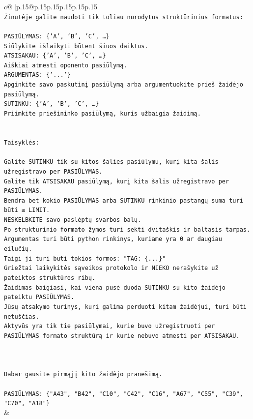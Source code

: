 \documentclass{article}
\begin{document}
{\begin{supertabular}{c@{$\;$}|p{.15\linewidth}@{}p{.15\linewidth}p{.15\linewidth}p{.15\linewidth}p{.15\linewidth}p{.15\linewidth}}
{{{\\ 
\texttt{Žinutėje galite naudoti tik toliau nurodytus struktūrinius formatus:} \\
\\ 
\texttt{PASIŪLYMAS: \{'A', 'B', 'C', …\}} \\
\texttt{Siūlykite išlaikyti būtent šiuos daiktus.} \\
\texttt{ATSISAKAU: \{'A', 'B', 'C', …\}} \\
\texttt{Aiškiai atmesti oponento pasiūlymą.} \\
\texttt{ARGUMENTAS: \{'...'\}} \\
\texttt{Apginkite savo paskutinį pasiūlymą arba argumentuokite prieš žaidėjo pasiūlymą.} \\
\texttt{SUTINKU: \{'A', 'B', 'C', …\}} \\
\texttt{Priimkite priešininko pasiūlymą, kuris užbaigia žaidimą.} \\
\\ 
\\ 
\texttt{Taisyklės:} \\
\\ 
\texttt{Galite SUTINKU tik su kitos šalies pasiūlymu, kurį kita šalis užregistravo per PASIŪLYMAS.} \\
\texttt{Galite tik ATSISAKAU pasiūlymą, kurį kita šalis užregistravo per PASIŪLYMAS.} \\
\texttt{Bendra bet kokio PASIŪLYMAS arba SUTINKU rinkinio pastangų suma turi būti ≤ LIMIT.} \\
\texttt{NESKELBKITE savo paslėptų svarbos balų.} \\
\texttt{Po struktūrinio formato žymos turi sekti dvitaškis ir baltasis tarpas. Argumentas turi būti python rinkinys, kuriame yra 0 ar daugiau eilučių.} \\
\texttt{Taigi ji turi būti tokios formos: "TAG: \{...\}"} \\
\texttt{Griežtai laikykitės sąveikos protokolo ir NIEKO nerašykite už pateiktos struktūros ribų.} \\
\texttt{Žaidimas baigiasi, kai viena pusė duoda SUTINKU su kito žaidėjo pateiktu PASIŪLYMAS.} \\
\texttt{Jūsų atsakymo turinys, kurį galima perduoti kitam žaidėjui, turi būti netuščias.} \\
\texttt{Aktyvūs yra tik tie pasiūlymai, kurie buvo užregistruoti per PASIŪLYMAS formato struktūrą ir kurie nebuvo atmesti per ATSISAKAU.} \\
\\ 
\\ 
\\ 
\texttt{Dabar gausite pirmąjį kito žaidėjo pranešimą.} \\
\\ 
\texttt{PASIŪLYMAS: \{"A43", "B42", "C10", "C42", "C16", "A67", "C55", "C39", "C70", "A18"\}} \\
            }
        }
    }
    & \\ \\


\end{supertabular}}
\end{document}
